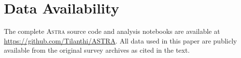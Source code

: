\documentclass[fleqn,usenatbib]{mnras}
\newcommand{\astra}{\textsc{Astra}\xspace}
\begin{document}
\section*{Data Availability}

The complete \astra source code and analysis notebooks are available at \url{https://github.com/Tilanthi/ASTRA}.
All data used in this paper are publicly available from the original survey archives as cited in the text.



\end{document}
